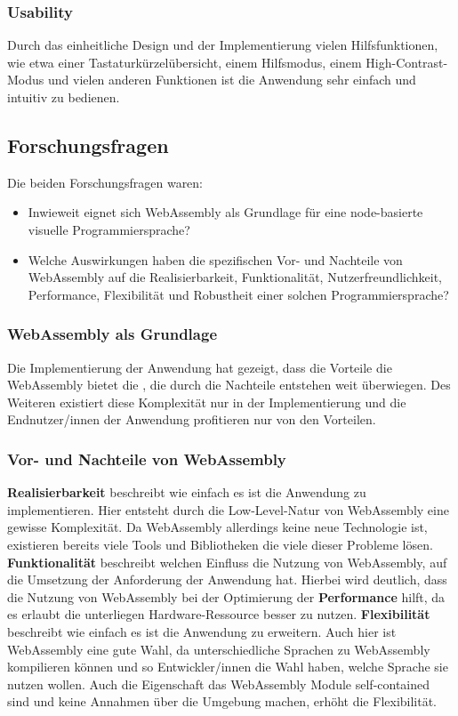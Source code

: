 \documentclass[ngerman]{article}
\begin{document}
\subsubsection{Usability}

Durch das einheitliche Design und der Implementierung vielen Hilfsfunktionen, wie etwa einer Tastaturkürzelübersicht, einem Hilfsmodus, einem High-Contrast-Modus und vielen anderen Funktionen ist die Anwendung sehr einfach und intuitiv zu bedienen. 

\subsection{Forschungsfragen}

Die beiden Forschungsfragen waren:

\begin{itemize}
  \item Inwieweit eignet sich WebAssembly als Grundlage für eine node-basierte visuelle Programmiersprache?  
  \item Welche Auswirkungen haben die spezifischen Vor- und Nachteile von WebAssembly auf die Realisierbarkeit, Funktionalität, Nutzerfreundlichkeit, Performance, Flexibilität und Robustheit einer solchen Programmiersprache?
\end{itemize}

\subsubsection{WebAssembly als Grundlage}
Die Implementierung der Anwendung hat gezeigt, dass die Vorteile die WebAssembly bietet die , die durch die Nachteile entstehen weit überwiegen.
Des Weiteren existiert diese Komplexität nur in der Implementierung und die Endnutzer/innen der Anwendung profitieren nur von den Vorteilen.

\subsubsection{Vor- und Nachteile von WebAssembly}
\textbf{Realisierbarkeit} beschreibt wie einfach es ist die Anwendung zu implementieren. Hier entsteht durch die Low-Level-Natur von WebAssembly eine gewisse Komplexität. 
Da WebAssembly allerdings keine neue Technologie ist, existieren bereits viele Tools und Bibliotheken die viele dieser Probleme lösen.
\br
\textbf{Funktionalität} beschreibt welchen Einfluss die Nutzung von WebAssembly, auf die Umsetzung der Anforderung der Anwendung hat. Hierbei wird deutlich, dass die Nutzung von WebAssembly bei der Optimierung der \textbf{Performance} hilft, da es erlaubt die unterliegen Hardware-Ressource besser zu nutzen.
\br
\textbf{Flexibilität} beschreibt wie einfach es ist die Anwendung zu erweitern. Auch hier ist WebAssembly eine gute Wahl, da unterschiedliche Sprachen zu WebAssembly kompilieren können und so Entwickler/innen die Wahl haben, welche Sprache sie nutzen wollen. Auch die Eigenschaft das WebAssembly Module self-contained sind und keine Annahmen über die Umgebung machen, erhöht die Flexibilität.
\end{document}
